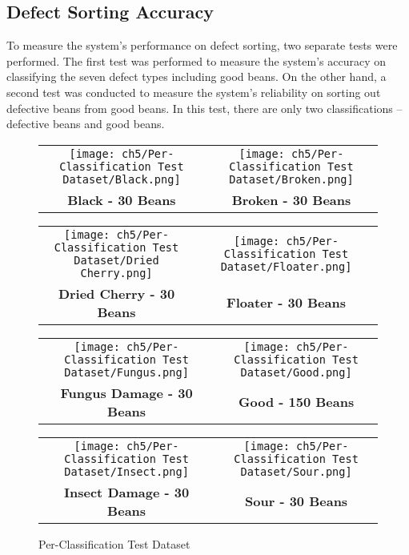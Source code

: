 \subsection{Defect Sorting Accuracy}

To measure the system’s performance on defect sorting, two separate tests were performed. The first test was performed to measure the system’s accuracy on classifying the seven defect types including good beans. On the other hand, a second test was conducted to measure the system’s reliability on sorting out defective beans from good beans. In this test, there are only two classifications – defective beans and good beans. 

\begin{figure}[H]
	\centering
	\begin{tabular}{cc}
		\texttt{[image: ch5/Per-Classification Test Dataset/Black.png]} &
		\texttt{[image: ch5/Per-Classification Test Dataset/Broken.png]} \\
		\textbf{Black - 30 Beans}  & \textbf{Broken - 30 Beans} \\[6pt]
	\end{tabular}
	\begin{tabular}{cc}
		\texttt{[image: ch5/Per-Classification Test Dataset/Dried Cherry.png]} &
		\texttt{[image: ch5/Per-Classification Test Dataset/Floater.png]} \\
		\textbf{Dried Cherry - 30 Beans}  & \textbf{Floater - 30 Beans} \\[6pt]
	\end{tabular}
	\begin{tabular}{cc}
		\texttt{[image: ch5/Per-Classification Test Dataset/Fungus.png]} &
		\texttt{[image: ch5/Per-Classification Test Dataset/Good.png]} \\
		\textbf{Fungus Damage - 30 Beans}  & \textbf{Good - 150 Beans} \\[6pt]
	\end{tabular}
	\begin{tabular}{cc}
		\texttt{[image: ch5/Per-Classification Test Dataset/Insect.png]} &
		\texttt{[image: ch5/Per-Classification Test Dataset/Sour.png]} \\
		\textbf{Insect Damage - 30 Beans}  & \textbf{Sour - 30 Beans} \\[6pt]
	\end{tabular}
	\caption{Per-Classification	Test Dataset}
	\label{fig:per_classification_test_dataset}
\end{figure}

